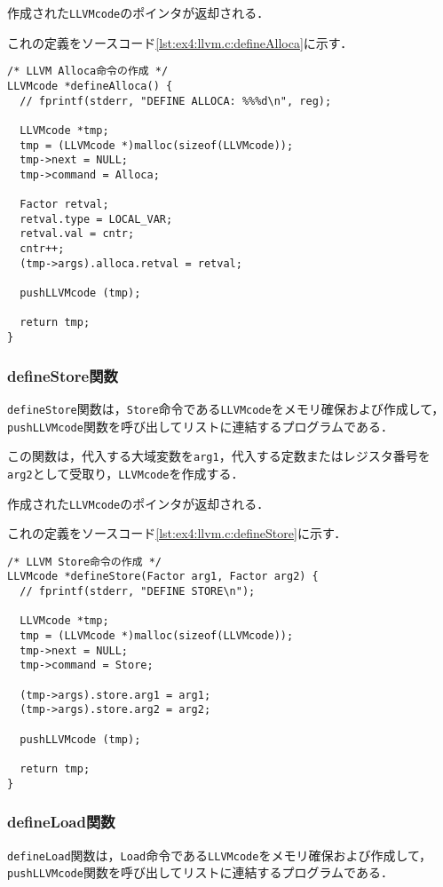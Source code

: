 \documentclass[uplatex]{jsarticle}
\begin{document}
作成された\verb#LLVMcode#のポインタが返却される．

これの定義をソースコード\ref{lst:ex4:llvm.c:defineAlloca}に示す．

\begin{lstlisting}[caption=defineAlloca関数の定義,label=lst:ex4:llvm.c:defineAlloca]
/* LLVM Alloca命令の作成 */
LLVMcode *defineAlloca() {
  // fprintf(stderr, "DEFINE ALLOCA: %%%d\n", reg);

  LLVMcode *tmp;
  tmp = (LLVMcode *)malloc(sizeof(LLVMcode));
  tmp->next = NULL;
  tmp->command = Alloca;

  Factor retval;
  retval.type = LOCAL_VAR;
  retval.val = cntr;
  cntr++;
  (tmp->args).alloca.retval = retval;

  pushLLVMcode (tmp);

  return tmp;
}
\end{lstlisting}

\subsubsection{defineStore関数}
\verb#defineStore#関数は，\verb#Store#命令である\verb#LLVMcode#をメモリ確保および作成して，\verb#pushLLVMcode#関数を呼び出してリストに連結するプログラムである．

この関数は，代入する大域変数を\verb#arg1#，代入する定数またはレジスタ番号を\verb#arg2#として受取り，\verb#LLVMcode#を作成する．

作成された\verb#LLVMcode#のポインタが返却される．

これの定義をソースコード\ref{lst:ex4:llvm.c:defineStore}に示す．

\begin{lstlisting}[caption=defineStore関数の定義,label=lst:ex4:llvm.c:defineStore]
/* LLVM Store命令の作成 */
LLVMcode *defineStore(Factor arg1, Factor arg2) {
  // fprintf(stderr, "DEFINE STORE\n");

  LLVMcode *tmp;
  tmp = (LLVMcode *)malloc(sizeof(LLVMcode));
  tmp->next = NULL;
  tmp->command = Store;

  (tmp->args).store.arg1 = arg1;
  (tmp->args).store.arg2 = arg2;

  pushLLVMcode (tmp);

  return tmp;
}
\end{lstlisting}

\subsubsection{defineLoad関数}
\verb#defineLoad#関数は，\verb#Load#命令である\verb#LLVMcode#をメモリ確保および作成して，\verb#pushLLVMcode#関数を呼び出してリストに連結するプログラムである．
\end{document}
